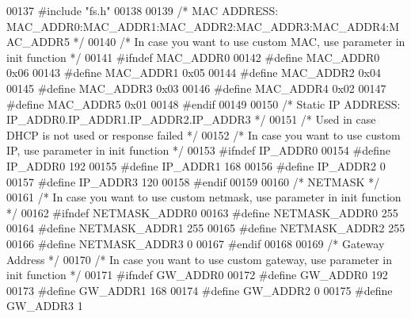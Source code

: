 \begin{DoxyCode}
00137 \textcolor{preprocessor}{#include "fs.h"}
00138 
00139 \textcolor{comment}{/* MAC ADDRESS: MAC\_ADDR0:MAC\_ADDR1:MAC\_ADDR2:MAC\_ADDR3:MAC\_ADDR4:MAC\_ADDR5 */}
00140 \textcolor{comment}{/* In case you want to use custom MAC, use parameter in init function */}
00141 \textcolor{preprocessor}{#ifndef MAC\_ADDR0}
00142 \textcolor{preprocessor}{#define MAC\_ADDR0                           0x06}
00143 \textcolor{preprocessor}{#define MAC\_ADDR1                           0x05}
00144 \textcolor{preprocessor}{#define MAC\_ADDR2                           0x04}
00145 \textcolor{preprocessor}{#define MAC\_ADDR3                           0x03}
00146 \textcolor{preprocessor}{#define MAC\_ADDR4                           0x02}
00147 \textcolor{preprocessor}{#define MAC\_ADDR5                           0x01}
00148 \textcolor{preprocessor}{#endif}
00149 
00150 \textcolor{comment}{/* Static IP ADDRESS: IP\_ADDR0.IP\_ADDR1.IP\_ADDR2.IP\_ADDR3 */}
00151 \textcolor{comment}{/* Used in case DHCP is not used or response failed */}
00152 \textcolor{comment}{/* In case you want to use custom IP, use parameter in init function */}
00153 \textcolor{preprocessor}{#ifndef IP\_ADDR0}
00154 \textcolor{preprocessor}{#define IP\_ADDR0                            192}
00155 \textcolor{preprocessor}{#define IP\_ADDR1                            168}
00156 \textcolor{preprocessor}{#define IP\_ADDR2                            0}
00157 \textcolor{preprocessor}{#define IP\_ADDR3                            120}
00158 \textcolor{preprocessor}{#endif}
00159 
00160 \textcolor{comment}{/* NETMASK */}
00161 \textcolor{comment}{/* In case you want to use custom netmask, use parameter in init function */}
00162 \textcolor{preprocessor}{#ifndef NETMASK\_ADDR0}
00163 \textcolor{preprocessor}{#define NETMASK\_ADDR0                       255}
00164 \textcolor{preprocessor}{#define NETMASK\_ADDR1                       255}
00165 \textcolor{preprocessor}{#define NETMASK\_ADDR2                       255}
00166 \textcolor{preprocessor}{#define NETMASK\_ADDR3                       0}
00167 \textcolor{preprocessor}{#endif}
00168 
00169 \textcolor{comment}{/* Gateway Address */}
00170 \textcolor{comment}{/* In case you want to use custom gateway, use parameter in init function */}
00171 \textcolor{preprocessor}{#ifndef GW\_ADDR0}
00172 \textcolor{preprocessor}{#define GW\_ADDR0                            192}
00173 \textcolor{preprocessor}{#define GW\_ADDR1                            168}
00174 \textcolor{preprocessor}{#define GW\_ADDR2                            0}
00175 \textcolor{preprocessor}{#define GW\_ADDR3                            1}

\end{DoxyCode}
